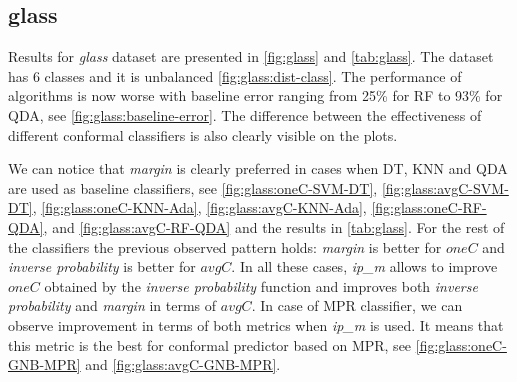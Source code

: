 \subsection{glass}

Results for \textit{glass} dataset are presented in \cref{fig:glass} and \cref{tab:glass}. The 
dataset has 6 classes and it is unbalanced \cref{fig:glass:dist-class}. The performance of 
algorithms is now worse with baseline error ranging from 25\% for RF to 93\% for QDA, see 
\cref{fig:glass:baseline-error}. The difference between the effectiveness of different conformal
classifiers is also clearly visible on the plots.

We can notice that \textit{margin} is clearly preferred in cases when DT, KNN and QDA are used as baseline classifiers, see \cref{fig:glass:oneC-SVM-DT}, \cref{fig:glass:avgC-SVM-DT}, \cref{fig:glass:oneC-KNN-Ada}, \cref{fig:glass:avgC-KNN-Ada}, \cref{fig:glass:oneC-RF-QDA},
and \cref{fig:glass:avgC-RF-QDA} and the results in \cref{tab:glass}. For the rest of the 
classifiers the previous observed pattern holds: \textit{margin} is better for $oneC$ and 
\textit{inverse probability} is better for $avgC$. In all these cases, \textit{ip\_m} allows to improve $oneC$ obtained by the \textit{inverse probability} function and improves both \textit{inverse probability} and \textit{margin} in terms of $avgC$. In case of MPR classifier, we can observe improvement in terms of both metrics when \textit{ip\_m} is used. It means that this metric is the best for conformal predictor based on MPR, see \cref{fig:glass:oneC-GNB-MPR}
and \cref{fig:glass:avgC-GNB-MPR}.





%